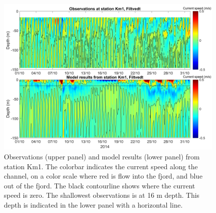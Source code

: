 \clearpage 

\begin{figure}[ht]
	\centerline{
		\includegraphics*[trim=0 0 0 0,clip=true,width=\textwidth]{Figurer/AndreS/Km1_Obs_vs_Mod_v2}}
	\caption{\small Observations (upper panel) and model results (lower panel) from station Km1. The colorbar indicates the current speed along the channel, on a color scale where red is flow into the fjord, and blue out of the fjord. The black contourline shows where the current speed is zero. The shallowest observations is at 16 m depth. This depth is indicated in the lower panel with a horizontal line.}
	\label{fig:Km1}
\end{figure}


\clearpage 

